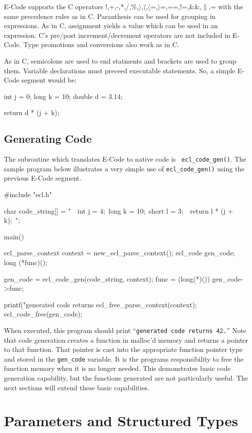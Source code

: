 \documentclass[11pt]{article}
\begin{document}
E-Code supports the C operators
!,+,-,*,/,\%,$\rangle$,$\langle$,$\langle$=,$\rangle$=,==,!=,\&\&,$\|$,= with
the same precedence rules as in C.  Paranthesis can be used for grouping in
expressions.  As in C, assignment yields a value which can be used in an
expression.  C's pre/post increment/decrement operators are not included in
E-Code.  Type promotions and conversions also work as in C.

As in C, semicolons are used to end statments and brackets are used to group
them.   Variable declarations must preceed executable statements.  So, a
simple E-Code segment would be:
\begin{Code}
{
    int j = 0;
    long k = 10;
    double d = 3.14;

    return d * (j + k);
}
\end{Code}

\subsection{Generating Code}
The subroutine which translates E-Code to native code is {\tt
ecl\_code\_gen()}.  The sample program below illustrates a very simple use of
{\tt ecl\_code\_gen()} using the previous E-Code segment.
\begin{Code}
#include "ecl.h"

char code_string[] = "\
{\n\
    int j = 4;\n\
    long k = 10;\n\
    short l = 3;\n\
\n\
    return l * (j + k);\n\
}";

main()
{
    ecl_parse_context context = new_ecl_parse_context();
    ecl_code gen_code;
    long (*func)();

    gen_code = ecl_code_gen(code_string, context);
    func = (long(*)()) gen_code->func;

    printf("generated code returns %
    ecl_free_parse_context(context);
    ecl_code_free(gen_code);
}
\end{Code}
When executed, this program should print ``{\tt generated code returns 42.}''
Note that code generation creates a function in malloc'd memory and returns a
pointer to that function.  That pointer is cast into the appropriate function
pointer type and stored in the {\tt gen\_code} variable.  It is the programs
responsibility to free the function memory when it is no longer needed.  This
demonstrates basic code generation capability, but the functions generated are
not particularly useful.  The next sections will extend these basic
capabilities. 

\section{Parameters and Structured Types}
\end{document}
